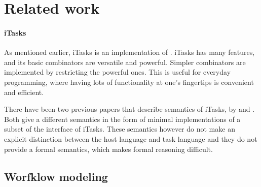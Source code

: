 


\section{Related work}
\label{sec:relatedwork}



\paragraph{iTasks}

As mentioned earlier, iTasks is an implementation of \TOP. iTasks has many
features, and its basic combinators are versatile and powerful. Simpler
combinators are implemented by restricting the powerful ones. This is useful for
everyday programming, where having lots of functionality at one's fingertips is
convenient and efficient.

There have been two previous papers that describe semantics of iTasks, by
\citet{conf/ifl/KoopmanPA08} and \citet{conf/ppdp/PlasmeijerLMAK12}.
Both give a different semantics in the form of minimal implementations of a
subset of the interface of iTasks. These semantics however do not make an
explicit distinction between the host language and task language and they do not
provide a formal semantics, which makes formal reasoning difficult.





\subsection{Worfklow modeling}

